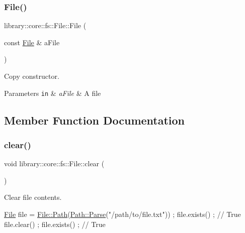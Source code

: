 \subsubsection{\texorpdfstring{File()}{File()}}
{\footnotesize\ttfamily library\+::core\+::fs\+::\+File\+::\+File (\begin{DoxyParamCaption}\item[{const \hyperlink{classlibrary_1_1core_1_1fs_1_1_file}{File} \&}]{a\+File }\end{DoxyParamCaption})}



Copy constructor. 


\begin{DoxyParams}[1]{Parameters}
\mbox{\tt in}  & {\em a\+File} & A file \\
\hline
\end{DoxyParams}


\subsection{Member Function Documentation}
\mbox{\label{classlibrary_1_1core_1_1fs_1_1_file_a0b95ab08dd8df2cc28b2e42a72ae0b9a}} 
\subsubsection{\texorpdfstring{clear()}{clear()}}
{\footnotesize\ttfamily void library\+::core\+::fs\+::\+File\+::clear (\begin{DoxyParamCaption}{ }\end{DoxyParamCaption})}



Clear file contents. 


\begin{DoxyCode}
\hyperlink{classlibrary_1_1core_1_1fs_1_1_file_a6f3f0d79545ac9984c6f49432f0c6c39}{File} file = \hyperlink{classlibrary_1_1core_1_1fs_1_1_file_a72d6cdf8bb7e299889c6149e2b8a6cc7}{File::Path}(\hyperlink{classlibrary_1_1core_1_1fs_1_1_path_a6ba644b6609507e724c217bf2020f5ae}{Path::Parse}(\textcolor{stringliteral}{"/path/to/file.txt"})) ;
file.exists() ; \textcolor{comment}{// True}
file.clear() ;
file.exists() ; \textcolor{comment}{// True}
\end{DoxyCode}
 \mbox{\label{classlibrary_1_1core_1_1fs_1_1_file_a9fd8a0cca72e2414f071d6045c0a1a0d}} 
